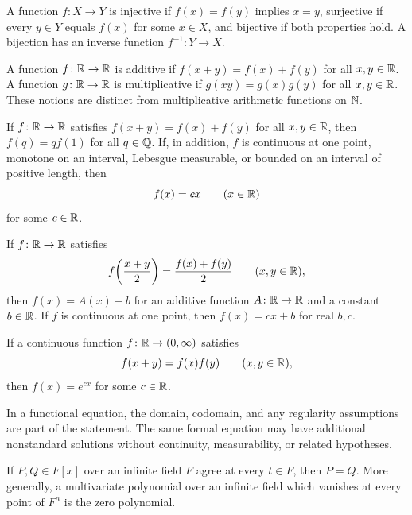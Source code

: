 \begin{definition}
A function $f\colon X\to Y$ is injective if $f(x)=f(y)$ implies $x=y$, surjective if every $y\in Y$ equals $f(x)$ for some $x\in X$, and bijective if both properties hold. A bijection has an inverse function $f^{-1}\colon Y\to X$.
\end{definition}

\begin{definition}
A function $f\colon\mathbb{R}\to\mathbb{R}$ is additive if $f(x+y)=f(x)+f(y)$ for all $x, y\in\mathbb{R}$. A function $g\colon\mathbb{R}\to\mathbb{R}$ is multiplicative if $g(xy)=g(x)g(y)$ for all $x, y\in\mathbb{R}$. These notions are distinct from multiplicative arithmetic functions on $\mathbb{N}$.
\end{definition}

\begin{theorem}
If $f\colon\mathbb{R}\to\mathbb{R}$ satisfies $f(x+y)=f(x)+f(y)$ for all $x, y\in\mathbb{R}$, then $f(q)=qf(1)$ for all $q\in\mathbb{Q}$. If, in addition, $f$ is continuous at one point, monotone on an interval, Lebesgue measurable, or bounded on an interval of positive length, then
\[
 f(x)=cx\qquad(x\in\mathbb{R})
\]
for some $c\in\mathbb{R}$.
\end{theorem}

\begin{theorem}
If $f\colon\mathbb{R}\to\mathbb{R}$ satisfies
\[
 f\!\left(\frac{x+y}{2}\right)=\frac{f(x)+f(y)}2
 \qquad(x, y\in\mathbb{R}),
\]
then $f(x)=A(x)+b$ for an additive function $A\colon\mathbb{R}\to\mathbb{R}$ and a constant $b\in\mathbb{R}$. If $f$ is continuous at one point, then $f(x)=cx+b$ for real $b, c$.
\end{theorem}

\begin{theorem}
If a continuous function $f\colon\mathbb{R}\to(0, \infty)$ satisfies
\[
 f(x+y)=f(x)f(y)\qquad(x, y\in\mathbb{R}),
\]
then $f(x)=e^{cx}$ for some $c\in\mathbb{R}$.
\end{theorem}

\begin{remark}
In a functional equation, the domain, codomain, and any regularity assumptions are part of the statement. The same formal equation may have additional nonstandard solutions without continuity, measurability, or related hypotheses.
\end{remark}


\begin{theorem}
If $P,Q\in F[x]$ over an infinite field $F$ agree at every $t\in F$, then $P=Q$. More generally, a multivariate polynomial over an infinite field which vanishes at every point of $F^n$ is the zero polynomial.
\end{theorem}

